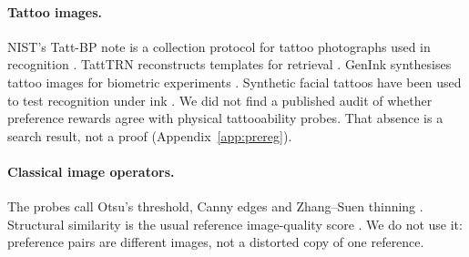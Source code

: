 \paragraph{Tattoo images.}
NIST's Tatt-BP note is a collection protocol for tattoo photographs used in recognition \citep{nist2016tattbp}.
TattTRN reconstructs templates for retrieval \citep{gonzalezsoler2024tatttrn}.
GenInk synthesises tattoo images for biometric experiments \citep{genink2025}.
Synthetic facial tattoos have been used to test recognition under ink \citep{ibsen2022facebeneath}.
We did not find a published audit of whether preference rewards agree with physical tattooability probes.
That absence is a search result, not a proof (Appendix~\ref{app:prereg}).

\paragraph{Classical image operators.}
The probes call Otsu's threshold, Canny edges and Zhang--Suen thinning \citep{otsu1979,canny1986,zhang1984thinning}.
Structural similarity is the usual reference image-quality score \citep{wang2004ssim}.
We do not use it: preference pairs are different images, not a distorted copy of one reference.
